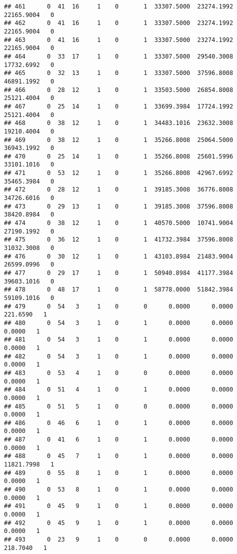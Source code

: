 \documentclass[
]{article}
\begin{document}
\begin{enumerate}
\begin{verbatim}
## 461      0  41  16     1    0       1  33307.5000  23274.1992  22165.9004   0
## 462      0  41  16     1    0       1  33307.5000  23274.1992  22165.9004   0
## 463      0  41  16     1    0       1  33307.5000  23274.1992  22165.9004   0
## 464      0  33  17     1    0       1  33307.5000  29540.3008  17732.6992   0
## 465      0  32  13     1    0       1  33307.5000  37596.8008  46891.1992   0
## 466      0  28  12     1    0       1  33503.5000  26854.8008  25121.4004   0
## 467      0  25  14     1    0       1  33699.3984  17724.1992  25121.4004   0
## 468      0  38  12     1    0       1  34483.1016  23632.3008  19210.4004   0
## 469      0  38  12     1    0       1  35266.8008  25064.5000  36943.1992   0
## 470      0  25  14     1    0       1  35266.8008  25601.5996  33101.1016   0
## 471      0  53  12     1    0       1  35266.8008  42967.6992  35465.3984   0
## 472      0  28  12     1    0       1  39185.3008  36776.8008  34726.6016   0
## 473      0  29  13     1    0       1  39185.3008  37596.8008  38420.8984   0
## 474      0  38  12     1    0       1  40570.5000  10741.9004  27190.1992   0
## 475      0  36  12     1    0       1  41732.3984  37596.8008  31032.3008   0
## 476      0  30  12     1    0       1  43103.8984  21483.9004  26599.0996   0
## 477      0  29  17     1    0       1  50940.8984  41177.3984  39603.1016   0
## 478      0  48  17     1    0       1  58778.0000  51842.3984  59109.1016   0
## 479      0  54   3     1    0       0      0.0000      0.0000    221.6590   1
## 480      0  54   3     1    0       1      0.0000      0.0000      0.0000   1
## 481      0  54   3     1    0       1      0.0000      0.0000      0.0000   1
## 482      0  54   3     1    0       1      0.0000      0.0000      0.0000   1
## 483      0  53   4     1    0       0      0.0000      0.0000      0.0000   1
## 484      0  51   4     1    0       1      0.0000      0.0000      0.0000   1
## 485      0  51   5     1    0       0      0.0000      0.0000      0.0000   1
## 486      0  46   6     1    0       1      0.0000      0.0000      0.0000   1
## 487      0  41   6     1    0       1      0.0000      0.0000      0.0000   1
## 488      0  45   7     1    0       1      0.0000      0.0000  11821.7998   1
## 489      0  55   8     1    0       1      0.0000      0.0000      0.0000   1
## 490      0  53   8     1    0       1      0.0000      0.0000      0.0000   1
## 491      0  45   9     1    0       1      0.0000      0.0000      0.0000   1
## 492      0  45   9     1    0       1      0.0000      0.0000      0.0000   1
## 493      0  23   9     1    0       0      0.0000      0.0000    218.7040   1

\end{verbatim}
\end{enumerate}
\end{document}

